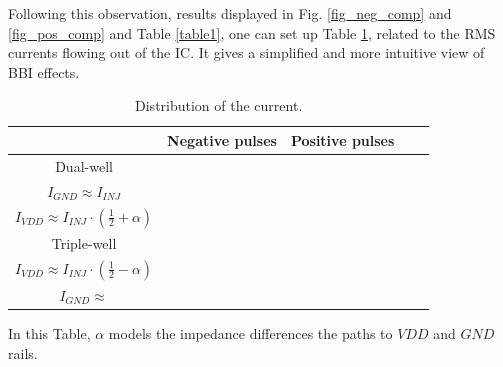 \documentclass[10pt, conference, compsocconf]{IEEEtran}
\begin{document}
Following this observation, results displayed in Fig. \ref{fig_neg_comp} and \ref{fig_pos_comp} and Table \ref{table1}, one can set up Table \ref{table2}, related to the RMS currents flowing out of the IC. It gives a simplified and more intuitive view of BBI effects.
\begin{table}[!t]
\centering
\renewcommand{\arraystretch}{2.5}
\caption{Distribution of the current.}
\label{table2}
\centering
\begin{tabular}{|c||c|c|c|c|}
\hline
& Negative pulses & Positive pulses\\
\hline
Dual-well &
\makecell{$I_{VDD} \approx 0$\\$I_{GND} \approx I_{INJ}$} &
\makecell{$I_{VDD} \approx I_{INJ} \cdot (\frac{1}{2} - \alpha)$\\
          $I_{VDD} \approx I_{INJ} \cdot (\frac{1}{2} + \alpha) $}\\
\hline
Triple-well &
\makecell{$I_{VDD} \approx I_{INJ} \cdot (\frac{1}{2} + \alpha)$\\
          $I_{VDD} \approx I_{INJ} \cdot (\frac{1}{2} - \alpha)$} &
\makecell{$I_{VDD} \approx I_{INJ}$\\$I_{GND} \approx$}\\
\hline
\end{tabular}
\end{table}
In this Table, $\alpha$ models the impedance differences the paths to $VDD$ and $GND$ rails.
\end{document}
